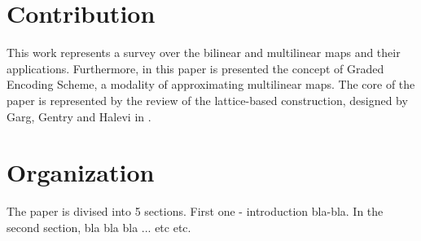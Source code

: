 \section{Contribution}

This work represents a survey over the bilinear and multilinear maps and their applications. Furthermore, in this paper is presented the concept of Graded Encoding Scheme, a modality of approximating multilinear maps. The core of the paper is represented by the review of the lattice-based construction, designed by Garg, Gentry and Halevi in \cite{GGH13}. 

\section{Organization}

The paper is divised into 5 sections. First one - introduction bla-bla. In the second section, bla bla bla ... etc etc.
